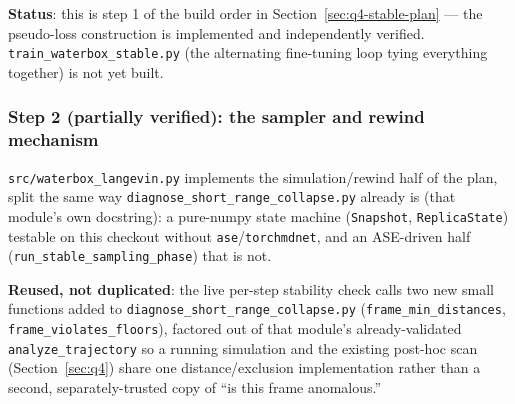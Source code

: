 \documentclass[11pt]{article}
\begin{document}
\textbf{Status}: this is step 1 of the build order in
Section~\ref{sec:q4-stable-plan} --- the pseudo-loss construction is
implemented and independently verified. \texttt{train\_waterbox\_stable.py}
(the alternating fine-tuning loop tying everything together) is not yet
built.

\subsubsection{Step 2 (partially verified): the sampler and rewind mechanism}
\label{sec:q4-stable-step2}

\texttt{src/waterbox\_langevin.py} implements the simulation/rewind half of
the plan, split the same way \texttt{diagnose\_short\_range\_collapse.py}
already is (that module's own docstring): a pure-numpy state machine
(\texttt{Snapshot}, \texttt{ReplicaState}) testable on this checkout without
\texttt{ase}/\texttt{torchmdnet}, and an ASE-driven half
(\texttt{run\_stable\_sampling\_phase}) that is not.

\textbf{Reused, not duplicated}: the live per-step stability check calls two
new small functions added to \texttt{diagnose\_short\_range\_collapse.py}
(\texttt{frame\_min\_distances}, \texttt{frame\_violates\_floors}), factored
out of that module's already-validated \texttt{analyze\_trajectory} so a
running simulation and the existing post-hoc scan
(Section~\ref{sec:q4}) share one distance/exclusion implementation rather
than a second, separately-trusted copy of ``is this frame anomalous.''
\end{document}
